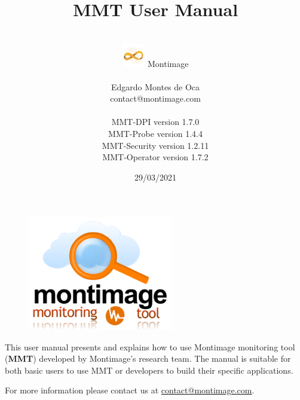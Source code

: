 \documentclass[a4paper]{refart}
\title{MMT User Manual}
\author{\\
\includegraphics[width=1cm,valign=c]{img/icon64x64.png} Montimage \\
~\\
Edgardo Montes de Oca \\
{contact@montimage.com}\\
~\\
MMT-DPI      version 1.7.0\\
MMT-Probe    version 1.4.4\\
MMT-Security version 1.2.11\\
MMT-Operator version 1.7.2}
\date{29/03/2021}
\begin{document}
\maketitle

\vfill
\begin{figure}[H]
\hfill
\includegraphics[width=2.5in]{img/mmt_logo.png}
\end{figure}

This user manual presents and explains how to use Montimage monitoring tool (\textbf{MMT}) developed by Montimage's research team.
The manual is suitable for both basic users to use MMT or developers to build their specific applications.


For more information please contact us at \url{contact@montimage.com}.

\newpage

\tableofcontents

\newpage








%


\end{document}
